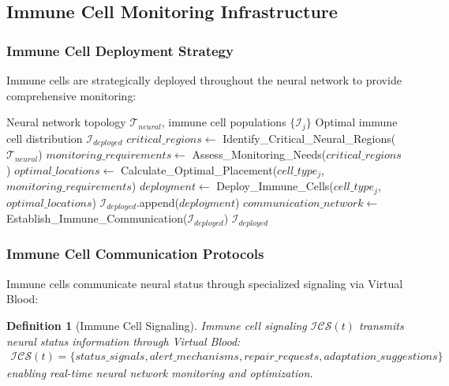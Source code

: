 \documentclass[12pt,a4paper]{article}
\newtheorem{definition}{Definition}
\begin{document}
\subsection{Immune Cell Monitoring Infrastructure}

\subsubsection{Immune Cell Deployment Strategy}

Immune cells are strategically deployed throughout the neural network to provide comprehensive monitoring:

\begin{algorithm}
\caption{Immune Cell Sensor Deployment}
\begin{algorithmic}[1]
\Require Neural network topology $\mathcal{T}_{neural}$, immune cell populations $\{\mathcal{I}_j\}$
\Ensure Optimal immune cell distribution $\mathcal{I}_{deployed}$
\State $critical\_regions \leftarrow$ Identify\_Critical\_Neural\_Regions($\mathcal{T}_{neural}$)
\State $monitoring\_requirements \leftarrow$ Assess\_Monitoring\_Needs($critical\_regions$)
    \State $optimal\_locations \leftarrow$ Calculate\_Optimal\_Placement($cell\_type_j$, $monitoring\_requirements$)
    \State $deployment \leftarrow$ Deploy\_Immune\_Cells($cell\_type_j$, $optimal\_locations$)
    \State $\mathcal{I}_{deployed}$.append($deployment$)
\EndFor
\State $communication\_network \leftarrow$ Establish\_Immune\_Communication($\mathcal{I}_{deployed}$)
\State \Return $\mathcal{I}_{deployed}$
\end{algorithmic}
\end{algorithm}

\subsubsection{Immune Cell Communication Protocols}

Immune cells communicate neural status through specialized signaling via Virtual Blood:

\begin{definition}[Immune Cell Signaling]
Immune cell signaling $\mathcal{ICS}(t)$ transmits neural status information through Virtual Blood:
\begin{align}
\mathcal{ICS}(t) = \{status\_signals, alert\_mechanisms, repair\_requests, adaptation\_suggestions\}
\end{align}
enabling real-time neural network monitoring and optimization.
\end{definition}
\end{document}
